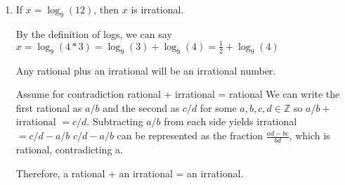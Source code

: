 \documentclass[11pt]{article}
\begin{document}
\begin{enumerate}
\begin{enumerate}
\begin{enumerate}
      While I understand Michael's thought process, I thought his wording was not very good. The way he chose his cases for the exhaustive proof didn't feel complete or standard to say the least.

    \item

      After thinking more about it, I'm still not sure if this exhaustive proof covers every case. When I asked him about the case where you have 5 blues, 5 reds, 5 square and 5 circles, he pointed to his last case, saying it was the standard case. However, I don't think he ever really proved that case. I'm still not entirely sure as the wording and the way he went about the proof confused me.

    \end{enumerate}
    
  \item %

     
    \begin{theorem}[Problem 1]
     If $x = \log_9(12)$, then $x$ is irrational.
    \end{theorem}
    \begin{longFormProof}
     \step By the definition of logs, we can say $x = \log_9(4*3) = \log_9(3) +
             \log_9(4) = \frac{1}{2} + \log_9(4)$
     
     \smallskip
     \hrulefill
     \smallskip
     
           \begin{lemma}
             Any rational plus an irrational will be an irrational number.
           \end{lemma}
     
           \begin{longFormProof}
             \begin{block}[blockL]
                {Assume for contradiction rational + irrational = rational}
             \step We can write the first rational as $a/b$ and the second as $c/d$
                for some $a, b, c, d \in \mathbb{Z}$ so $a/b +$ irrational $=c/d$.
             \step Subtracting $a/b$ from each side yields irrational $=c/d - a/b$
             \step $c/d - a/b$ can be represented as the fraction $\frac{ad-bc}{bd}$, which is rational, contradicting a.
             \end{block}
             \step Therefore, a rational + an irrational = an irrational.
           \end{longFormProof}
     

\end{longFormProof}
\end{enumerate}
\end{enumerate}
\end{document}
